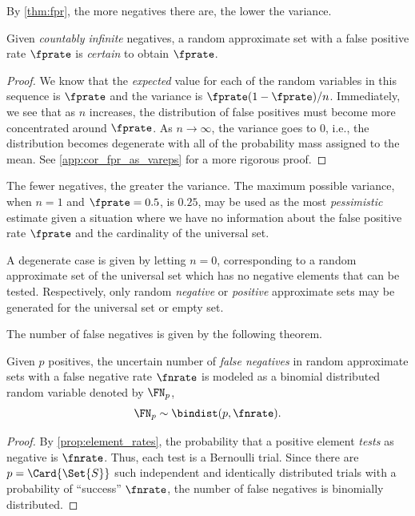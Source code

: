 By \cref{thm:fpr}, the more negatives there are, the lower the variance.
\begin{corollary}
\label{cor:fpr_as_vareps}
	Given \emph{countably infinite} negatives, a random approximate set with a false positive rate $\fprate$ is \emph{certain} to obtain $\fprate$.
\end{corollary}
\begin{proof}
We know that the \emph{expected} value for each of the random variables in this sequence is $\fprate$ and the variance is $\fprate(1-\fprate)/n$.
Immediately, we see that as $n$ increases, the distribution of false positives must become more concentrated around $\fprate$.
As $n \to \infty$, the variance goes to $0$, i.e., the distribution becomes degenerate with all of the probability mass assigned to the mean. See \cref{app:cor_fpr_as_vareps} for a more rigorous proof.
\end{proof}

The fewer negatives, the greater the variance.
The maximum possible variance, when $n=1$ and $\fprate = 0.5$, is $0.25$, may be used as the most \emph{pessimistic} estimate given a situation where we have no information about the false positive rate $\fprate$ and the cardinality of the universal set.

A degenerate case is given by letting $n = 0$, corresponding to a random approximate set of the universal set which has no negative elements that can be tested.
Respectively, only random \emph{negative} or \emph{positive} approximate sets may be generated for the universal set or empty set.

The number of false negatives is given by the following theorem.
\begin{theorem}
\label{thm:fnbinom}
Given $p$ positives, the uncertain number of \emph{false negatives} in random approximate sets with a false negative rate $\fnrate$ is modeled as a binomial distributed random variable denoted by $\FN_p$,
\begin{equation}
	\FN_p \sim \bindist(p, \fnrate).
\end{equation}
\end{theorem}
\begin{proof}
By \cref{prop:element_rates}, the probability that a positive element \emph{tests} as negative is $\fnrate$.
Thus, each test is a Bernoulli trial.
Since there are $p = \Card{\Set{S}}$ such independent and identically distributed trials with a probability of ``success'' $\fnrate$, the number of false negatives is binomially distributed.
\end{proof}

